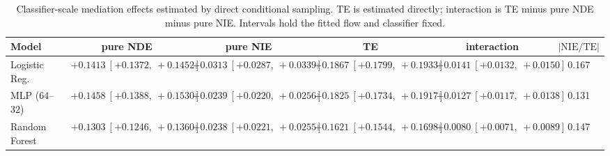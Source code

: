 \begin{table}[htbp]
  \centering
  \caption{Classifier-scale mediation effects estimated by direct conditional sampling. TE is estimated directly; interaction is TE minus pure NDE minus pure NIE. Intervals hold the fitted flow and classifier fixed.}
  \label{tab:adult_gap_overall}
  \begin{tabular}{lccccc}
    \toprule
    Model & pure NDE & pure NIE & TE & interaction & $|\mathrm{NIE}/\mathrm{TE}|$ \\
    \midrule
    Logistic Reg. & $+0.1413\ [+0.1372,\ +0.1452]$ & $+0.0313\ [+0.0287,\ +0.0339]$ & $+0.1867\ [+0.1799,\ +0.1933]$ & $+0.0141\ [+0.0132,\ +0.0150]$ & 0.167 \\
    MLP (64--32) & $+0.1458\ [+0.1388,\ +0.1530]$ & $+0.0239\ [+0.0220,\ +0.0256]$ & $+0.1825\ [+0.1734,\ +0.1917]$ & $+0.0127\ [+0.0117,\ +0.0138]$ & 0.131 \\
    Random Forest & $+0.1303\ [+0.1246,\ +0.1360]$ & $+0.0238\ [+0.0221,\ +0.0255]$ & $+0.1621\ [+0.1544,\ +0.1698]$ & $+0.0080\ [+0.0071,\ +0.0089]$ & 0.147 \\
    \bottomrule
  \end{tabular}
\end{table}